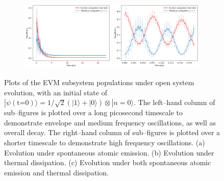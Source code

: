 \documentclass[11pt]{article}
\begin{document}
\begin{figure}[H]
    \begin{subfigure}{\textwidth}
        \centering
        \includegraphics[width=0.49\textwidth]{Research Project/Code/results/ExVib/Open/Population/Envelope/pops_ex_both_eg.png}
        \hfill
        \includegraphics[width=0.49\textwidth]{Research Project/Code/results/ExVib/Open/Population/Fast/pops_ex_both_eg.png}
        \caption{}
        \label{fig:EVM_OQS_Pop_both_eg}
    \end{subfigure}
    \caption{Plots of the EVM subsystem populations under open system evolution, with an initial state of $|\psi (\text{t=0})\rangle = 1/\sqrt{2}(|1\rangle + |0\rangle)\otimes|n=0\rangle$. The left--hand column of sub--figures is plotted over a long picosecond timescale to demonstrate envelope and medium frequency oscillations, as well as overall decay. The right--hand column of sub--figures is plotted over a shorter timescale to demonstrate high frequency oscillations. (a) Evolution under spontaneous atomic emission. (b) Evolution under thermal dissipation. (c) Evolution under both spontaneous atomic emission and thermal dissipation.}
    \label{fig:EVM_OQS_Pop_eg}
\end{figure}
\end{document}
